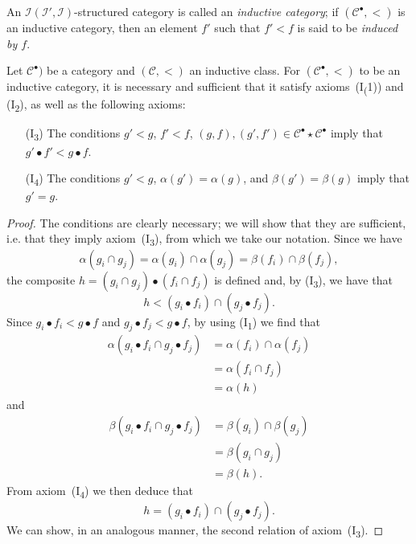 \documentclass[a4paper,fleqn]{article}
\theoremstyle{plain}
\newenvironment{theorem}[1]
  {\renewcommand\theinnertheorem{#1}\innertheorem}
  {\endinnertheorem}
\theoremstyle{definition}
\newenvironment{definition}[1]
  {\renewcommand\theinnerdefinition{#1}\innerdefinition}
  {\endinnerdefinition}
\newcommand{\oldpage}[1]{{\marginpar{\footnotesize$\bigg\vert$\,\,\,\,\textit{p.~#1}}}}
\newcommand{\CC}{\mathcal{C}}
\newcommand{\II}{\mathcal{I}}
\newcommand{\smallbullet}{\bullet}
\begin{document}
\begin{definition}{21}
\label{definition:ii-21}
  An $\II(\II',\II)$-structured category is called an \emph{inductive category};
  if $(\CC^\smallbullet,<)$ is an inductive category, then an element $f'$ such that $f'<f$ is said to be \emph{induced by $f$}.
\end{definition}

\begin{theorem}{9}
\label{theorem:ii-9}
  Let $\CC^\smallbullet)$ be a category and $(\CC,<)$ an inductive class.
  For $(\CC^\smallbullet,<)$ to be an inductive category, it is necessary and sufficient that it satisfy axioms~(I\textsubscript(1)) and (I\textsubscript{2}), as well as the following axioms:
  \begin{enumerate}
    \item[\normalfont(I\textquotesingle\!\textsubscript{3})]
      The conditions $g'<g$, $f'<f$, $(g,f),(g',f')\in\CC^\smallbullet\star\CC^\smallbullet$ imply that $g'\smallbullet f'<g\smallbullet f$.
    \item[\normalfont(I\textquotesingle\!\textsubscript{4})]
      The conditions $g'<g$, $\alpha(g')=\alpha(g)$, and $\beta(g')=\beta(g)$ imply that $g'=g$.
  \end{enumerate}
\end{theorem}

\begin{proof}
  The conditions are clearly necessary; we will show that they are sufficient, i.e. that they imply axiom~(I\textsubscript{3}), from which we take our notation.
  Since we have
  \[
    \alpha(g_i\cap g_j)
    = \alpha(g_i)\cap\alpha(g_j)
    = \beta(f_i)\cap\beta(f_j),
  \]
  the composite $h=(g_i\cap g_j)\smallbullet(f_i\cap f_j)$ is defined and, by (I\textquotesingle\!\textsubscript{3}), we have that
  \[
    h < (g_i\smallbullet f_i)\cap(g_j\smallbullet f_j).
  \]
  Since $g_i\smallbullet f_i<g\smallbullet f$ and $g_j\smallbullet f_j<g\smallbullet f$, by using (I\textsubscript{1}) we find that
  \[
    \begin{aligned}
      \alpha(g_i\smallbullet f_i\cap g_j\smallbullet f_j)
      &= \alpha(f_i)\cap\alpha(f_j)
    \\&= \alpha(f_i\cap f_j)
    \\&= \alpha(h)
    \end{aligned}
  \]
  and
  \[
    \begin{aligned}
      \beta(g_i\smallbullet f_i\cap g_j\smallbullet f_j)
      &= \beta(g_i)\cap\beta(g_j)
    \\&= \beta(g_i\cap g_j)
    \\&= \beta(h).
    \end{aligned}
  \]
  \oldpage{406}
  From axiom~(I\textquotesingle\!\textsubscript{4}) we then deduce that
  \[
    h
    = (g_i\smallbullet f_i)\cap(g_j\smallbullet f_j).
  \]
  We can show, in an analogous manner, the second relation of axiom~(I\textquotesingle\!\textsubscript{3}).
\end{proof}
\end{document}
